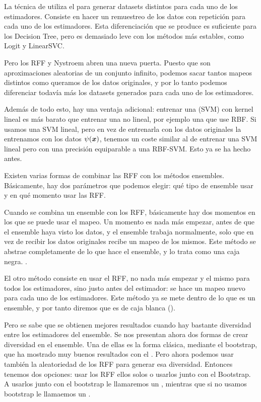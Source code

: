   La técnica de  utiliza el  para generar datasets
  distintos para cada uno de los estimadores. Consiste en hacer un remuestreo de
  los datos con repetición para cada uno de los estimadores. Esta diferenciación
  que se produce es suficiente para los Decision Tree, pero es demasiado leve con
  los métodos más estables, como Logit y LinearSVC.

  Pero los RFF y Nystroem abren una nueva puerta. Puesto que son aproximaciones
  aleatorias de un conjunto infinito, podemos sacar tantos mapeos distintos
  como queramos de los datos originales, y por lo tanto podemos diferenciar
  todavía más los datasets generados para cada uno de los estimadores.

  Además de todo esto, hay una ventaja adicional: entrenar una  (SVM) con kernel lineal es más barato que entrenar una no lineal, por
  ejemplo una que use RBF. Si usamos una SVM lineal, pero en vez de entrenarla
  con los datos originales la entrenamos con los datos $\psi(\bm{x})$, tenemos un
  coste similar al de entrenar una SVM lineal pero con una precisión equiparable
  a una RBF-SVM. Esto ya se ha hecho antes.

  Existen varias formas de combinar las RFF con los métodos ensembles. Básicamente,
  hay dos parámetros que podemos elegir: qué tipo de ensemble usar y en qué
  momento usar las RFF.

  Cuando se combina un ensemble con los RFF, básicamente hay dos momentos en
  los que se puede usar el mapeo. Un momento es nada más empezar, antes de
  que el ensemble haya visto los datos, y el ensemble trabaja normalmente, solo
  que en vez de recibir los datos originales recibe un mapeo de los mismos.
  Este método se abstrae completamente de lo que hace el ensemble, y lo trata
  como una caja negra. .

  El otro método consiste en usar el RFF, no nada más empezar y el mismo para
  todos los estimadores, sino justo antes del estimador: se hace un mapeo nuevo
  para cada uno de los estimadores. Este método ya se mete dentro de lo que es
  un ensemble, y por tanto diremos que es de caja blanca ().

  Pero se sabe que se obtienen mejores resultados cuando hay bastante diversidad
  entre los estimadores del ensemble. Se nos presentan ahora dos formas de crear
  diversidad en el ensemble. Una de ellas es la forma clásica, mediante el
  bootstrap, que ha mostrado muy buenos resultados con el .
  Pero ahora podemos usar también la aleatoriedad de los RFF para generar
  esa diversidad. Entonces tenemos dos opciones: usar los RFF ellos solos o usarlos
  junto con el Bootstrap. A usarlos junto con el bootstrap le llamaremos un
  , mientras que si no usamos bootstrap le llamaemos un .

